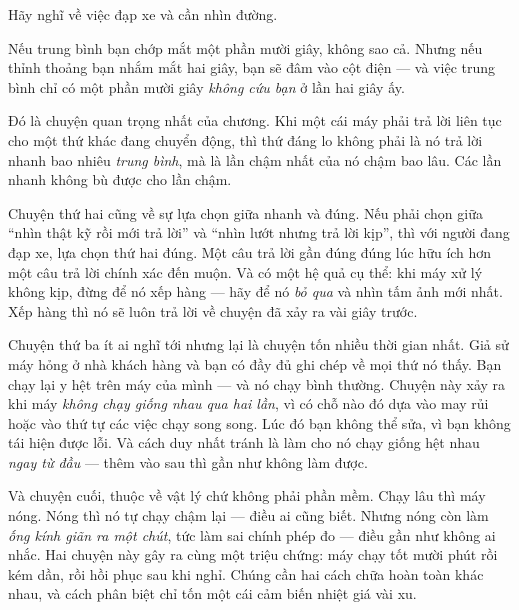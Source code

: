 \documentclass[../../vslam.tex]{subfiles}
\begin{document}
\begin{dongian}
Hãy nghĩ về việc đạp xe và cần nhìn đường.

Nếu trung bình bạn chớp mắt một phần mười giây, không sao cả. Nhưng nếu thỉnh thoảng bạn nhắm mắt hai giây, bạn sẽ đâm vào cột điện --- và việc trung bình chỉ có một phần mười giây \emph{không cứu bạn} ở lần hai giây ấy.

Đó là chuyện quan trọng nhất của chương. Khi một cái máy phải trả lời liên tục cho một thứ khác đang chuyển động, thì thứ đáng lo không phải là nó trả lời nhanh bao nhiêu \emph{trung bình}, mà là lần chậm nhất của nó chậm bao lâu. Các lần nhanh không bù được cho lần chậm.

Chuyện thứ hai cũng về sự lựa chọn giữa nhanh và đúng. Nếu phải chọn giữa ``nhìn thật kỹ rồi mới trả lời'' và ``nhìn lướt nhưng trả lời kịp'', thì với người đang đạp xe, lựa chọn thứ hai đúng. Một câu trả lời gần đúng đúng lúc hữu ích hơn một câu trả lời chính xác đến muộn. Và có một hệ quả cụ thể: khi máy xử lý không kịp, đừng để nó xếp hàng --- hãy để nó \emph{bỏ qua} và nhìn tấm ảnh mới nhất. Xếp hàng thì nó sẽ luôn trả lời về chuyện đã xảy ra vài giây trước.

Chuyện thứ ba ít ai nghĩ tới nhưng lại là chuyện tốn nhiều thời gian nhất. Giả sử máy hỏng ở nhà khách hàng và bạn có đầy đủ ghi chép về mọi thứ nó thấy. Bạn chạy lại y hệt trên máy của mình --- và nó chạy bình thường. Chuyện này xảy ra khi máy \emph{không chạy giống nhau qua hai lần}, vì có chỗ nào đó dựa vào may rủi hoặc vào thứ tự các việc chạy song song. Lúc đó bạn không thể sửa, vì bạn không tái hiện được lỗi. Và cách duy nhất tránh là làm cho nó chạy giống hệt nhau \emph{ngay từ đầu} --- thêm vào sau thì gần như không làm được.

Và chuyện cuối, thuộc về vật lý chứ không phải phần mềm. Chạy lâu thì máy nóng. Nóng thì nó tự chạy chậm lại --- điều ai cũng biết. Nhưng nóng còn làm \emph{ống kính giãn ra một chút}, tức làm sai chính phép đo --- điều gần như không ai nhắc. Hai chuyện này gây ra cùng một triệu chứng: máy chạy tốt mười phút rồi kém dần, rồi hồi phục sau khi nghỉ. Chúng cần hai cách chữa hoàn toàn khác nhau, và cách phân biệt chỉ tốn một cái cảm biến nhiệt giá vài xu.

\end{dongian}
\end{document}
